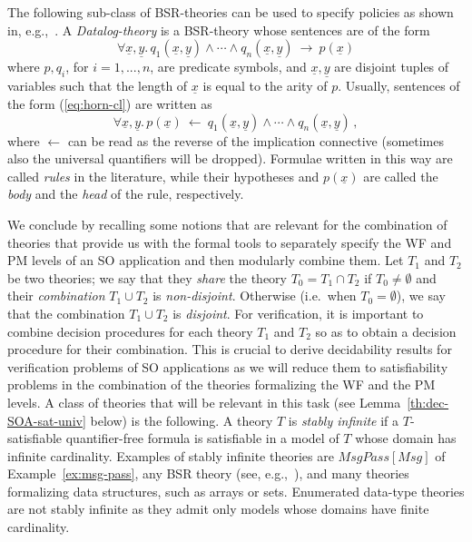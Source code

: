 \documentclass[conference]{IEEEtran}
\begin{document}
The following sub-class of BSR-theories can be used to specify
policies as shown in, e.g.,~\cite{SPKI-SDSI-in-FOL}.  A
\emph{Datalog-theory} is a BSR-theory whose sentences are of the form
\begin{equation}\label{eq:horn-cl}
    \forall \underline{x},\underline{y}.\,
     q_1(\underline{x}, \underline{y}) \wedge \cdots \wedge
     q_n(\underline{x}, \underline{y}) 
      \ \rightarrow \
      p(\underline{x})
\end{equation}
where $p,q_i$, for $i=1,...,n$, are predicate symbols,
and $\underline{x},\underline{y}$ are disjoint tuples of variables such
that the length of $\underline{x}$ is equal to the arity of $p$.
Usually, sentences of the form (\ref{eq:horn-cl}) are written as 
\begin{displaymath}
  \forall \underline{x},\underline{y}.\,
  p(\underline{x})
  \ \leftarrow \
  q_1(\underline{x}, \underline{y}) \wedge \cdots \wedge
  q_n(\underline{x}, \underline{y}) \,,
\end{displaymath}
where $\leftarrow$ can be read as the reverse of the implication
connective (sometimes also the universal quantifiers will be dropped).
Formulae written in this way are called \emph{rules} in the
literature, while their hypotheses and $p(\underline{x})$ are called
the \emph{body} and the \emph{head} of the rule, respectively.

We conclude by recalling some notions that are relevant for the
combination of theories that 
provide us with the formal tools to separately specify the WF and PM
levels of an SO application and then modularly combine them.  Let
$T_1$ and $T_2$ be two theories; we say that they \emph{share} the
theory $T_0=T_1\cap T_2$ if $T_0\neq \emptyset$ and their
\emph{combination} $T_1\cup T_2$ is \emph{non-disjoint}.  Otherwise
(i.e.\ when $T_0=\emptyset$), we say that the {combination} $T_1\cup
T_2$ is \emph{disjoint}.  For verification, it is important to combine
decision procedures for each theory $T_1$ and $T_2$ so as to obtain a
decision procedure for their combination.  This is crucial to 
derive decidability results for verification problems of SO
applications as we will reduce them to satisfiability problems in the
combination of the theories formalizing the WF and the PM levels.  A
class of theories that will be relevant in this task (see
Lemma~\ref{th:dec-SOA-sat-univ} below) is the following.  A theory $T$
is \emph{stably infinite} if a $T$-satisfiable quantifier-free formula
is satisfiable in a model of $T$ whose domain has infinite
cardinality.  Examples of stably infinite theories are
$\mathit{MsgPass}[\mathit{Msg}]$ of Example~\ref{ex:msg-pass}, any BSR
theory (see, e.g.,~\cite{tinelli-zarba}), and many theories
formalizing data structures, such as arrays or sets.  Enumerated
data-type theories are not stably infinite as they admit only models
whose domains have finite cardinality.
\end{document}
